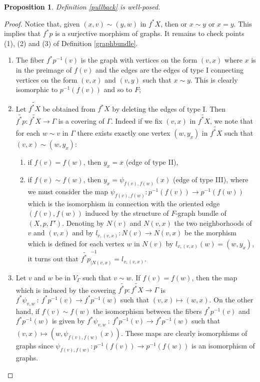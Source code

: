\documentclass{amsart}
\newtheorem{prop}[theo]{Proposition}
\theoremstyle{definition}
\numberwithin{equation}{section}
\begin{document}
\begin{prop}
Definition \ref{pullback} is well-posed.
\end{prop}
\begin{proof}
Notice that, given $(x,v) \sim (y,w)$ in $f^*X$, then or $x \sim y$ or $x=y$. This implies that $f^*p$ is a surjective morphism of graphs. It remains to check points (1), (2) and (3) of Definition \ref{graphbundle}.
\begin{enumerate}
 
 \item[(1).] The fiber $f^*p^{-1}(v)$ is the graph with vertices on the form $(v,x)$ where $x$ is in the preimage of $f(v)$ and the edges are the edges of type I connecting vertices on the form $(v,x)$ and $(v,y)$ such that $x \sim y$. This is clearly isomorphic to $p^{-1}(f(v))$ and so to $F$;

 \item[(2).] Let $\widetilde{f^*X}$ be obtained from $f^*X$ by deleting the edges of type I. Then $\widetilde{f^*p}: \widetilde{f^*X} \longrightarrow \Gamma$ is a covering of $\Gamma$. Indeed if we fix $(v,x)$ in $\widetilde{f^*X}$, we note that for each $w \sim v$ in $\Gamma$ there exists exactly one vertex $(w, y_x)$ in $\widetilde{f^*X}$ such that $(v,x) \sim (w, y_x)$: 
 \begin{enumerate} \item[(a).]if $f(v) = f(w)$, then $y_x=x$ (edge of type II), \item[(b).] if $f(v) \sim f(w)$, then $y_x=\psi_{f(v), f(w)}(x)$ (edge of type III), where we must consider the map $\psi_{f(v), f(w)}  :   p^{-1}(f(v)) \to p^{-1}(f(w))$ which is the isomorphism in connection with the oriented edge $(f(v), f(w))$ induced by the structure of $F$-graph bundle of $(X,p, \Gamma')$.  
 Denoting  by $N(v)$ and $N(v,x)$  the two neighborhoods of $v$ and $(v,x)$ and by $l_{v,(v,x)}: N(v) \longrightarrow N(v,x)$ be the morphism which is defined for each vertex $w$ in $N(v)$ by $l_{v,(v,x)}(w) = (w, y_x)$, it turns out that $\widetilde{f^*p}_{\vert N(v,x)}^{-1} =l_{v,(v,x)}$.
 \end{enumerate}
 
 \item[(3).] Let $v$ and $w$ be in $V_\Gamma$ such that $v \sim w$. If $f(v) = f(w)$, then the map which is induced by the  covering $\widetilde{f^*p}: \widetilde{f^*X} \longrightarrow \Gamma$ is 
         $f^*\psi_{v, w} \ : \  f^*p^{-1}(v) \to f^*p^{-1}(w)$ such that $(v, x) \mapsto (w, x).$
 On the other hand, if $f(v) \sim f(w)$ the isomorphism between the fibers $f^*p^{-1}(v)$ and $f^*p^{-1}(w)$ is given by       $f^*\psi_{v, w}  \ : \  f^*p^{-1}(v) \to f^*p^{-1}(w)$ such that   $(v, x) \mapsto (w, \psi_{f(v), f(w)}(x)).$ These maps are clearly isomorphisms of graphs since $\psi_{f(v), f(w)}: p^{-1}(f(v)) \longrightarrow p^{-1}(f(w))$ is an isomorphism of graphs.
\end{enumerate}
\end{proof}
\end{document}
